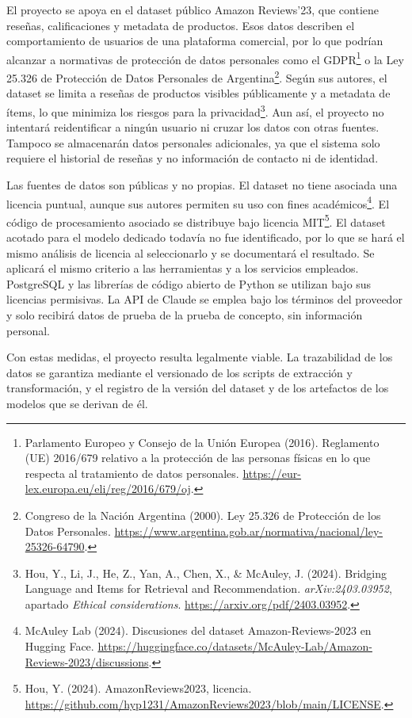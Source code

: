 \documentclass[
11pt, %
]{charter}
\begin{document}
El proyecto se apoya en el dataset público Amazon Reviews'23, que contiene reseñas, calificaciones y metadata de productos. Esos datos describen el comportamiento de usuarios de una plataforma comercial, por lo que podrían alcanzar a normativas de protección de datos personales como el GDPR\footnote{Parlamento Europeo y Consejo de la Unión Europea (2016). Reglamento (UE) 2016/679 relativo a la protección de las personas físicas en lo que respecta al tratamiento de datos personales. \url{https://eur-lex.europa.eu/eli/reg/2016/679/oj}.} o la Ley 25.326 de Protección de Datos Personales de Argentina\footnote{Congreso de la Nación Argentina (2000). Ley 25.326 de Protección de los Datos Personales. \url{https://www.argentina.gob.ar/normativa/nacional/ley-25326-64790}.}. Según sus autores, el dataset se limita a reseñas de productos visibles públicamente y a metadata de ítems, lo que minimiza los riesgos para la privacidad\footnote{Hou, Y., Li, J., He, Z., Yan, A., Chen, X., \& McAuley, J. (2024). Bridging Language and Items for Retrieval and Recommendation. \textit{arXiv:2403.03952}, apartado \textit{Ethical considerations}. \url{https://arxiv.org/pdf/2403.03952}.}. Aun así, el proyecto no intentará reidentificar a ningún usuario ni cruzar los datos con otras fuentes. Tampoco se almacenarán datos personales adicionales, ya que el sistema solo requiere el historial de reseñas y no información de contacto ni de identidad.

Las fuentes de datos son públicas y no propias. El dataset no tiene asociada una licencia puntual, aunque sus autores permiten su uso con fines académicos\footnote{McAuley Lab (2024). Discusiones del dataset Amazon-Reviews-2023 en Hugging Face. \url{https://huggingface.co/datasets/McAuley-Lab/Amazon-Reviews-2023/discussions}.}. El código de procesamiento asociado se distribuye bajo licencia MIT\footnote{Hou, Y. (2024). AmazonReviews2023, licencia. \url{https://github.com/hyp1231/AmazonReviews2023/blob/main/LICENSE}.}. El dataset acotado para el modelo dedicado todavía no fue identificado, por lo que se hará el mismo análisis de licencia al seleccionarlo y se documentará el resultado. Se aplicará el mismo criterio a las herramientas y a los servicios empleados. PostgreSQL y las librerías de código abierto de Python se utilizan bajo sus licencias permisivas. La API de Claude se emplea bajo los términos del proveedor y solo recibirá datos de prueba de la prueba de concepto, sin información personal.

Con estas medidas, el proyecto resulta legalmente viable. La trazabilidad de los datos se garantiza mediante el versionado de los scripts de extracción y transformación, y el registro de la versión del dataset y de los artefactos de los modelos que se derivan de él.
\end{document}
